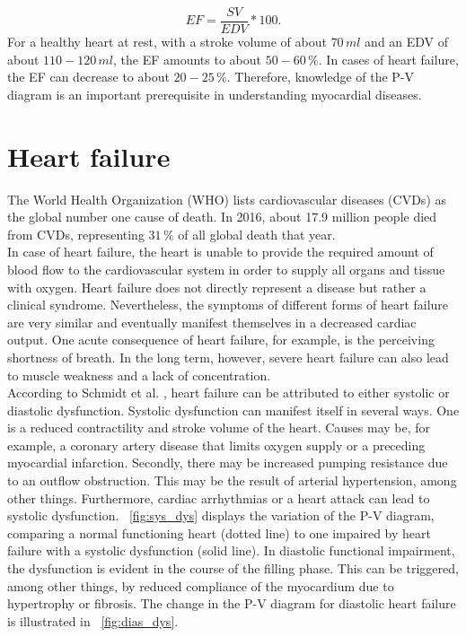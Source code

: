 \begin{equation}
  EF = \frac{SV}{EDV}*100.
 \label{eq:EF}
\end{equation}
For a healthy heart at rest, with a stroke volume of about $70 \, ml$ and an EDV of about $110-120 \, ml$, the EF amounts to about $50-60\, \%$. In cases of heart failure, the EF can decrease to about $20-25 \, \%$. Therefore, knowledge of the P-V diagram is an important prerequisite in understanding myocardial diseases. \cite{HKS4}

\section{Heart failure}
The World Health Organization (WHO) lists cardiovascular diseases (CVDs) as the global number one cause of death. In 2016, about 17.9 million people died from CVDs, representing $31 \,\%$ of all global death that year. \cite{WHO}
\\In case of heart failure, the heart is unable to provide the required amount of blood flow to the cardiovascular system in order to supply all organs and tissue with oxygen.
Heart failure does not directly represent a disease but rather a clinical syndrome. Nevertheless, the symptoms of different forms of heart failure are very similar and eventually manifest themselves in a decreased cardiac output. One acute consequence of heart failure, for example, is the perceiving shortness of breath. In the long term, however, severe heart failure can also lead to muscle weakness and a lack of concentration.
\\According to Schmidt et al. \cite{HKS4}, heart failure can be attributed to either systolic or diastolic dysfunction. Systolic dysfunction can manifest itself in several ways. One is a reduced contractility and stroke volume of the heart. Causes may be, for example, a coronary artery disease that limits oxygen supply or a preceding myocardial infarction. Secondly, there may be increased pumping resistance due to an outflow obstruction.  This may be the result of arterial hypertension, among other things. Furthermore, cardiac arrhythmias or a heart attack can lead to systolic dysfunction. \figurename~\ref{fig:sys_dys} displays the variation of the P-V diagram, comparing a normal functioning heart (dotted line) to one impaired by heart failure with a systolic dysfunction (solid line). In diastolic functional impairment, the dysfunction is evident in the course of the filling phase. This can be triggered, among other things, by reduced compliance of the myocardium due to hypertrophy or fibrosis. The change in the P-V diagram for diastolic heart failure is illustrated in \figurename~\ref{fig:dias_dys}.
